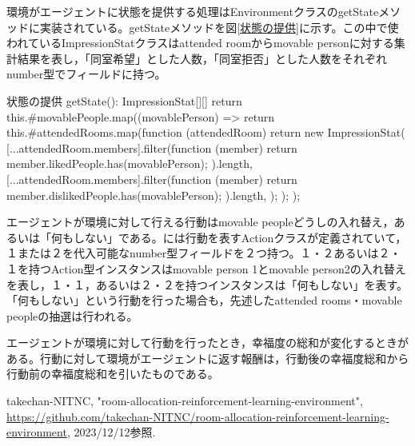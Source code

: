 \documentclass[titlepage]{ltjsreport}
\begin{document}
環境がエージェントに状態を提供する処理はEnvironmentクラスのgetStateメソッドに実装されている。getStateメソッドを図\ref{状態の提供}に示す。この中で使われているImpressionStatクラスはattended roomからmovable personに対する集計結果を表し，「同室希望」とした人数，「同室拒否」とした人数をそれぞれnumber型でフィールドに持つ。
\begin{textbox}{状態の提供}
getState(): ImpressionStat[][] {
	return this.#movablePeople.map((movablePerson) => {
		return this.#attendedRooms.map(function (attendedRoom) {
			return new ImpressionStat(
			[...attendedRoom.members].filter(function (member) {
				return member.likedPeople.has(movablePerson);
			}).length,
			[...attendedRoom.members].filter(function (member) {
				return member.dislikedPeople.has(movablePerson);
			}).length,
			);
		});
	});
}
\end{textbox}

エージェントが環境に対して行える行動はmovable peopleどうしの入れ替え，あるいは「何もしない」である。\cite{環境}には行動を表すActionクラスが定義されていて，１または２を代入可能なnumber型フィールドを２つ持つ。１・２あるいは２・１を持つAction型インスタンスはmovable person 1とmovable person2の入れ替えを表し，１・１，あるいは２・２を持つインスタンスは「何もしない」を表す。「何もしない」という行動を行った場合も，先述したattended rooms・movable peopleの抽選は行われる。

エージェントが環境に対して行動を行ったとき，幸福度の総和が変化するときがある。行動に対して環境がエージェントに返す報酬は，行動後の幸福度総和から行動前の幸福度総和を引いたものである。

\begin{thebibliography}{99}
 takechan-NITNC, "room-allocation-reinforcement-learning-environment", \url{https://github.com/takechan-NITNC/room-allocation-reinforcement-learning-environment}, 2023/12/12参照.
\end{thebibliography}
\end{document}
